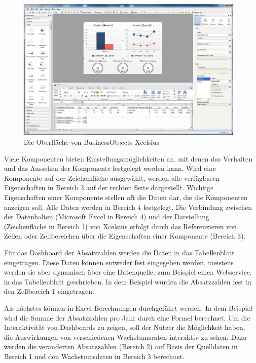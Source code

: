 \begin{onehalfspacing}
\begin{figure}[!ht]
\centering
\setlength{\unitlength}{1mm}
\includegraphics[width=15cm]{images/Abbildung5-Xcelsius-Oberflaeche.PNG}
\caption{Die Oberfläche von BusinessObjects Xcelsius\label{fig:xcelsius_ui_aufbau}}
\end{figure} 

Viele Komponenten bieten Einstellungsmöglichkeiten an, mit denen das Verhalten und das Aussehen der Komponente festgelegt werden kann. Wird eine Komponente auf der Zeichenfläche ausgewählt, werden alle verfügbaren Eigenschaften in Bereich 3 auf der rechten Seite dargestellt. Wichtige Eigenschaften einer Komponente stellen oft die Daten dar, die die Komponenten anzeigen soll. Alle Daten werden in Bereich 4 festgelegt. Die Verbindung zwischen der Datenhalten (Microsoft Excel in Bereich 4) und der Darstellung (Zeichenfläche in Bereich 1) von \gls{Xcelsius} erfolgt durch das Referenzieren von Zellen oder Zellbereichen über die Eigenschaften einer Komponente (Bereich 3).

Für das Dashboard der Absatzzahlen werden die Daten in das Tabellenblatt eingetragen. Diese Daten können entweder fest eingegeben werden, meistens werden sie aber dynamisch über eine Datenquelle, zum Beispiel einen Webservice, in das Tabellenblatt geschrieben. In dem Beispiel wurden die Absatzzahlen fest in den Zellbereich 1 eingetragen. 

Als nächstes können in Excel Berechnungen durchgeführt werden. In dem Beispiel wird die Summe der Absatzzahlen pro Jahr durch eine Formel berechnet. Um die Interaktivität von Dashboards zu zeigen, soll der Nutzer die Möglichkeit haben, die Auswirkungen von verschiedenen Wachstumsraten interaktiv zu sehen. Dazu werden die veränderten Absatzzahlen (Bereich 2) auf Basis der Quelldaten in Bereich 1 und den Wachstumsdaten in Bereich 3 berechnet.


\end{onehalfspacing}
